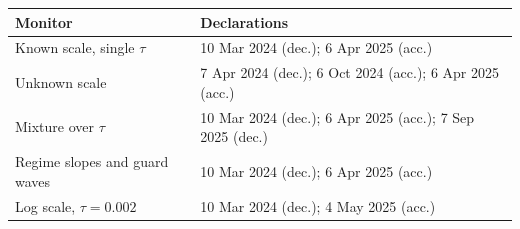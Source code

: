 \begin{tabular}{lp{9.5cm}}
\toprule
Monitor & Declarations \\
\midrule
Known scale, single $\tau$ & 10 Mar 2024 (dec.); 6 Apr 2025 (acc.) \\
Unknown scale & 7 Apr 2024 (dec.); 6 Oct 2024 (acc.); 6 Apr 2025 (acc.) \\
Mixture over $\tau$ & 10 Mar 2024 (dec.); 6 Apr 2025 (acc.); 7 Sep 2025 (dec.) \\
Regime slopes and guard waves & 10 Mar 2024 (dec.); 6 Apr 2025 (acc.) \\
Log scale, $\tau = 0.002$ & 10 Mar 2024 (dec.); 4 May 2025 (acc.) \\
\bottomrule
\end{tabular}
